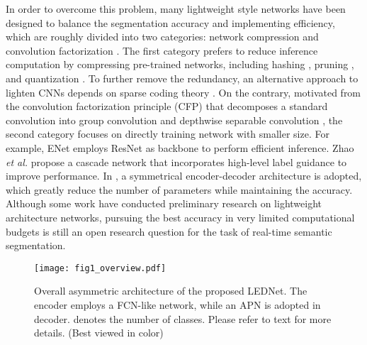 \documentclass{article}
\begin{document}
In order to overcome this problem, many lightweight style networks have been designed to balance the segmentation accuracy and implementing efficiency, which are roughly divided into two categories: network compression \cite{Chen2015compress,Han2016deep,Wu2016quantized,Rastegari2016xnor} and convolution factorization \cite{Paszke2016enet,Romera2018erfnet,Howard2017mobile}. The first category prefers to reduce inference computation by compressing pre-trained networks, including hashing \cite{Chen2015compress}, pruning \cite{Han2016deep}, and quantization \cite{Wu2016quantized,Rastegari2016xnor}. To further remove the redundancy, an alternative approach to lighten CNNs depends on sparse coding theory \cite{wen2016learning,liu2015sparse}. On the contrary, motivated from the convolution factorization principle (CFP) that decomposes a standard convolution into group convolution and depthwise separable convolution \cite{going2015szegedy,Howard2017mobile,Szegedy2016rethinking}, the second category focuses on directly training network with smaller size. For example, ENet \cite{Paszke2016enet} employs ResNet \cite{He2016deep} as backbone to perform efficient inference. Zhao \emph{et al.} \cite{Zhao2018ICnet} propose a cascade network that incorporates high-level label guidance to improve performance. In \cite{Badrinarayanan2015Segnet,Romera2018erfnet,Mehta2018espnet}, a symmetrical encoder-decoder architecture is adopted, which greatly reduce the number of parameters while maintaining the accuracy. Although some work have conducted preliminary research on lightweight architecture networks, pursuing the best accuracy in very limited computational budgets is still an open research question for the task of real-time semantic segmentation.

\begin{figure*}[!t]
\centerline{\texttt{[image: fig1\_overview.pdf]}}
\caption{Overall asymmetric architecture of the proposed LEDNet. The encoder employs a FCN-like network, while an APN is adopted in decoder.  denotes the number of classes. Please refer to text for more details. (Best viewed in color)} \label{fig:Overview}
\end{figure*}
\end{document}
